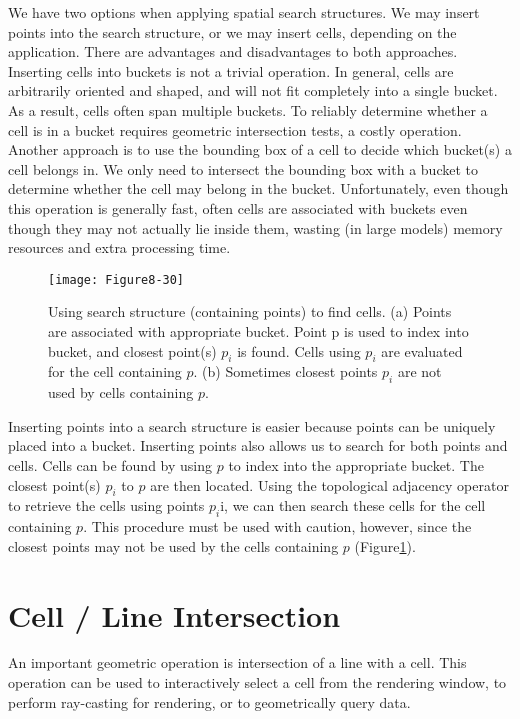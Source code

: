 We have two options when applying spatial search structures. We may insert points into the search structure, or we may insert cells, depending on the application. There are advantages and disadvantages to both approaches. Inserting cells into buckets is not a trivial operation. In general, cells are arbitrarily oriented and shaped, and will not fit completely into a single bucket. As a result, cells often span multiple buckets. To reliably determine whether a cell is in a bucket requires geometric intersection tests, a costly operation. Another approach is to use the bounding box of a cell to decide which bucket(s) a cell belongs in. We only need to intersect the bounding box with a bucket to determine whether the cell may belong in the bucket. Unfortunately, even though this operation is generally fast, often cells are associated with buckets even though they may not actually lie inside them, wasting (in large models) memory resources and extra processing time.

\begin{figure}[!htb]
    \centering
    \texttt{[image: Figure8-30]}\\
    \caption{Using search structure (containing points) to find cells. (a) Points are associated with appropriate bucket. Point p is used to index into bucket, and closest point(s) $p_i$ is found. Cells using $p_i$ are evaluated for the cell containing $p$. (b) Sometimes closest points $p_i$ are not used by cells containing $p$.}\label{fig:Figure8-30}
\end{figure}

Inserting points into a search structure is easier because points can be uniquely placed into a bucket. Inserting points also allows us to search for both points and cells. Cells can be found by using $p$ to index into the appropriate bucket. The closest point(s) $p_i$ to $p$ are then located. Using the topological adjacency operator to retrieve the cells using points $p_i$i, we can then search these cells for the cell containing $p$. This procedure must be used with caution, however, since the closest points may not be used by the cells containing $p$ (Figure\ref{fig:Figure8-30}).

\section{Cell / Line Intersection}

An important geometric operation is intersection of a line with a cell. This operation can be used to interactively select a cell from the rendering window, to perform ray-casting for rendering, or to geometrically query data.

